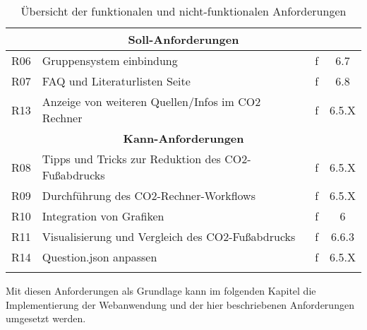 \begin{longtable}{|c|l|c|c|}
    \multicolumn{4}{|c|}{\textbf{Soll-Anforderungen}}                                      \\ \hline

    R06                  & Gruppensystem einbindung                           & f  & 6.7   \\ \hline
    R07                  & FAQ und Literaturlisten Seite                      & f  & 6.8   \\ \hline
    R13                  & Anzeige von weiteren Quellen/Infos im CO2 Rechner  & f  & 6.5.X \\ \hline

    \multicolumn{4}{|c|}{\textbf{Kann-Anforderungen}}                                      \\ \hline

    R08                  & Tipps und Tricks zur Reduktion des CO2-Fußabdrucks & f  & 6.5.X \\ \hline
    R09                  & Durchführung des CO2-Rechner-Workflows             & f  & 6.5.X \\ \hline
    R10                  & Integration von Grafiken                           & f  & 6     \\ \hline
    R11                  & Visualisierung und Vergleich des CO2-Fußabdrucks   & f  & 6.6.3 \\ \hline
    R14                  & Question.json anpassen                             & f  & 6.5.X \\ \hline
    \caption{Übersicht der funktionalen und nicht-funktionalen Anforderungen}
    \label{table:definied-tasks}
\end{longtable}


Mit diesen Anforderungen als Grundlage kann im folgenden Kapitel die Implementierung der Webanwendung und der hier beschriebenen Anforderungen umgesetzt werden.
